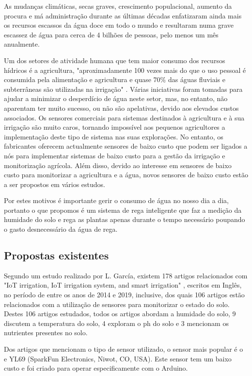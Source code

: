 \documentclass[conference]{IEEEtran}
\begin{document}
As mudanças climáticas, secas graves, crescimento populacional, aumento da procura e má 
administração durante as últimas décadas enfatizaram ainda mais os recursos escassos da água 
doce em todo o mundo e resultaram numa grave escassez de água para cerca de 4 bilhões de pessoas, 
pelo menos um mês anualmente. \cite{salehi2022global}

Um dos setores de atividade humana que tem maior consumo dos recursos hídricos é a agricultura, 
"aproximadamente 100 vezes mais do que o uso pessoal é consumida pela alimentação e agricultura 
e quase 70\% das águas fluviais e subterrâneas são utilizadas na irrigação" \cite{}. 
Várias iniciativas foram tomadas para ajudar a minimizar o desperdício de água neste setor, 
mas, no entanto, não aparentam ter muito sucesso, ou não são apelativas, devido aos 
elevados custos associados. Os sensores comerciais para sistemas destinados à 
agricultura e à sua irrigação são muito caros, tornando impossível aos pequenos 
agricultores a implementação deste tipo de sistema nas suas explorações. 
No entanto, os fabricantes oferecem actualmente sensores de baixo custo que podem 
ser ligados a nós para implementar sistemas de baixo custo para a gestão da 
irrigação e monitorização agrícola. Além disso, devido ao interesse em sensores de 
baixo custo para monitorizar a agricultura e a água, 
novos sensores de baixo custo estão a ser propostos em vários estudos. \cite{}

Por estes motivos é importante gerir o consumo de água no nosso dia a dia, portanto o que 
propomos é um sistema de rega inteligente que faz a medição da humidade do solo e rega 
as plantas apenas durante o tempo necessário poupando o gasto desnecessário da água de rega.

\subsection{Propostas existentes}
Segundo um estudo realizado por L. García, existem 178 artigos relacionados com  
"IoT irrigation, IoT irrigation system, and smart irrigation" \cite{}, escritos em Inglês, 
no período de entre os anos de 2014 e 2019, inclusive, dos quais 106 artigos estão 
relacionados com a utilização de sensores para monitorizar o estado do solo. 
Destes 106 artigos estudados, todos os artigos abordam a humidade do solo, 
9 discutem a temperatura do solo, 4 exploram o ph do solo e 3 mencionam os 
nutrientes presentes no solo.

Dos artigos que mencionam o tipo de sensor utilizado, o sensor mais popular é o 
e YL69 (SparkFun Electronics, Niwot, CO, USA). Este sensor tem um baixo custo e 
foi criado para operar especificamente com o Arduino. \cite{}
\end{document}
